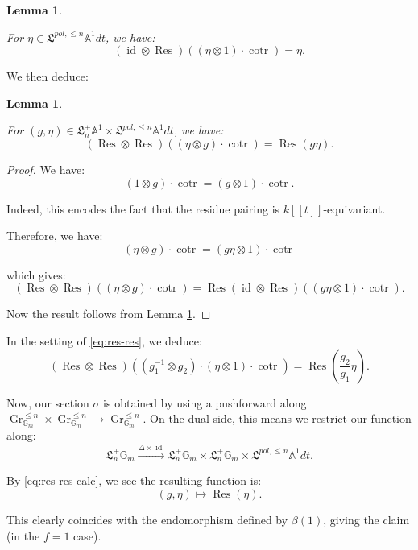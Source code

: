 \documentclass[reqno,11pt]{amsart}
\numberwithin{equation}{subsection}
\newtheorem{lem}[thm]{Lemma}
\theoremstyle{remark}
\newcommand{\xar}[1]{\xrightarrow{#1}}
\newcommand{\bA}{{\mathbb A}}
\newcommand{\bG}{{\mathbb G}}
\newcommand{\fL}{{\mathfrak L}}
\newcommand{\on}{\operatorname}
\newcommand{\id}{\on{id}}
\newcommand{\cotr}{\on{cotr}}
\newcommand{\Res}{\on{Res}}
\newcommand{\Gr}{\on{Gr}}
\begin{document}
\begin{lem}\label{l:res-cotr}

For $\eta \in \fL^{pol,\leq n} \bA^1 dt$, we have:
%
\[
(\id \otimes \Res)((\eta \otimes 1) \cdot \cotr) = \eta.
\]

\end{lem}

We then deduce:

\begin{lem}\label{l:res-res}

For $(g,\eta) \in  \fL_n^+\bA^1 \times \fL^{pol,\leq n} \bA^1 dt$, we have:
%
\[
(\Res \otimes \Res)((\eta \otimes g) \cdot \cotr) = \Res(g\eta).
\]

\end{lem}

\begin{proof}

We have:
%
\[
(1 \otimes g) \cdot \cotr = (g \otimes 1) \cdot \cotr.
\]

\noindent Indeed, this encodes the fact that the residue pairing is
$k[[t]]$-equivariant.

Therefore, we have:
%
\[
(\eta \otimes g) \cdot \cotr = (g\eta \otimes 1) \cdot \cotr
\]

\noindent which gives:
%
\[
(\Res \otimes \Res)((\eta \otimes g) \cdot \cotr) = 
\Res (\id \otimes \Res)((g\eta \otimes 1) \cdot \cotr).
\]

\noindent Now the result follows from Lemma \ref{l:res-cotr}.

\end{proof}

In the setting of \eqref{eq:res-res}, we deduce:
%
\begin{equation}\label{eq:res-res-calc}
(\Res \otimes \Res)((g_1^{-1} \otimes g_2) \cdot 
(\eta \otimes 1) \cdot \cotr) = 
\Res(\frac{g_2}{g_1} \eta).
\end{equation}

Now, our section $\sigma$ is obtained by using a pushforward
along $\Gr_{\bG_m}^{\leq n} \times \Gr_{\bG_m}^{\leq n} \to \Gr_{\bG_m}^{\leq n}$.
On the dual side, this means we restrict our function along: 
%
\[
\fL_n^+ \bG_m \xar{\Delta \times \id}
\fL_n^+\bG_m \times \fL_n^+\bG_m \times \fL^{pol,\leq n} \bA^1 dt.
\]

\noindent By \eqref{eq:res-res-calc}, we see the resulting function is:
%
\[
(g,\eta) \mapsto \Res(\eta).
\]

This clearly coincides with the endomorphism defined by $\beta(1)$, giving the
claim (in the $f=1$ case).
\end{document}
